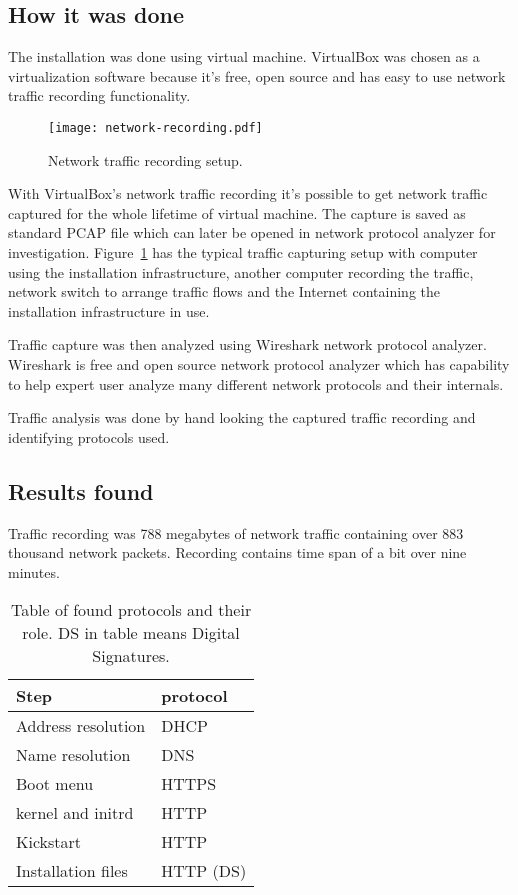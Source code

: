 \subsection{How it was done}

The installation was done using virtual machine. VirtualBox was chosen
as a virtualization software because it's free, open source and has
easy to use network traffic recording functionality.

\begin{figure}[h]
  \texttt{[image: network-recording.pdf]}
  \caption{Network traffic recording setup.\label{fig:network-recording}}
\end{figure}

With VirtualBox's network traffic recording it's possible to get
network traffic captured for the whole lifetime of virtual
machine. The capture is saved as standard PCAP file which can later be
opened in network protocol analyzer for
investigation. Figure~\ref{fig:network-recording} has the typical
traffic capturing setup with computer using the installation
infrastructure, another computer recording the traffic, network switch
to arrange traffic flows and the Internet containing the installation
infrastructure in use.

Traffic capture was then analyzed using Wireshark network protocol
analyzer. Wireshark is free and open source network protocol analyzer
which has capability to help expert user analyze many different
network protocols and their internals.

Traffic analysis was done by hand looking the captured traffic
recording and identifying protocols used.

\subsection{Results found}

Traffic recording was 788 megabytes of network traffic containing over
883 thousand network packets. Recording contains time span of a bit
over nine minutes.

\begin{table}[!ht]
  \def\arraystretch{1.1}%
  \begin{center}
    \begin{tabular}{| l | l |}
      \hline
      Step               & protocol    \\
      \hline
      Address resolution & DHCP        \\
      Name resolution    & DNS         \\
      Boot menu          & HTTPS       \\
      kernel and initrd  & HTTP        \\
      Kickstart          & HTTP        \\
      Installation files & HTTP (DS)   \\
      \hline
    \end{tabular}
    \caption{Table of found protocols and their role. DS in table
      means Digital Signatures.\label{tab:found_protocols_table}}
  \end{center}
\end{table}

